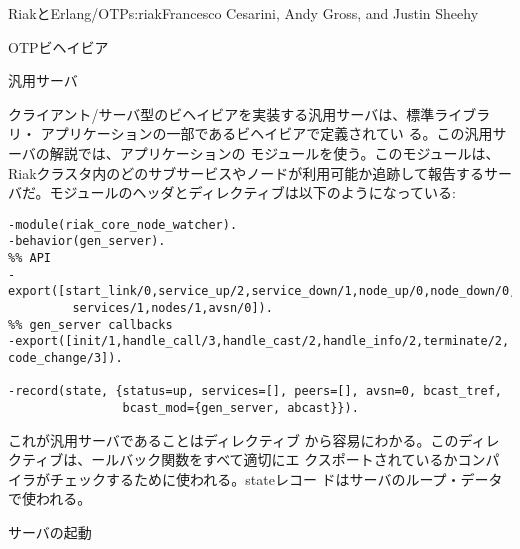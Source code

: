 \begin{aosachapter}{RiakとErlang/OTP}{s:riak}{Francesco Cesarini, Andy Gross, and Justin Sheehy}
\begin{aosasect1}{OTPビヘイビア}
\begin{aosasect2}{汎用サーバ}

クライアント/サーバ型のビヘイビアを実装する汎用サーバは、標準ライブラリ・
アプリケーションの一部であるビヘイビアで定義されてい
る。この汎用サーバの解説では、アプリケーションの
モジュールを使う。このモジュールは、
Riakクラスタ内のどのサブサービスやノードが利用可能か追跡して報告するサー
バだ。モジュールのヘッダとディレクティブは以下のようになっている:

\begin{verbatim}
-module(riak_core_node_watcher).
-behavior(gen_server).
%% API
-export([start_link/0,service_up/2,service_down/1,node_up/0,node_down/0,services/0,
         services/1,nodes/1,avsn/0]).
%% gen_server callbacks
-export([init/1,handle_call/3,handle_cast/2,handle_info/2,terminate/2, code_change/3]).

-record(state, {status=up, services=[], peers=[], avsn=0, bcast_tref,
                bcast_mod={gen_server, abcast}}).
\end{verbatim}


これが汎用サーバであることはディレクティブ
から容易にわかる。このディレクティブは、ールバック関数をすべて適切にエ
クスポートされているかコンパイラがチェックするために使われる。stateレコー
ドはサーバのループ・データで使われる。

\end{aosasect2}

\begin{aosasect2}{サーバの起動}



\end{aosasect2}
\end{aosasect1}
\end{aosachapter}
